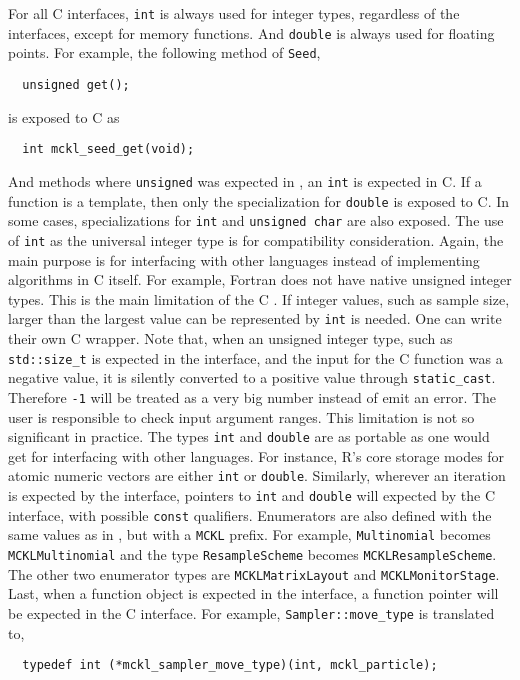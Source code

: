 For all C interfaces, \verb|int| is always used for integer types, regardless
of the \cpp interfaces, except for memory functions. And \verb|double| is
always used for floating points. For example, the following method of
\verb|Seed|,
\begin{Verbatim}
  unsigned get();
\end{Verbatim}
is exposed to C as
\begin{Verbatim}
  int mckl_seed_get(void);
\end{Verbatim}
And \rng methods where \verb|unsigned| was expected in \cpp, an \verb|int| is
expected in C. If a function is a template, then only the specialization for
\verb|double| is exposed to C. In some cases, specializations for \verb|int|
and \verb|unsigned char| are also exposed. The use of \verb|int| as the
universal integer type is for compatibility consideration. Again, the main
purpose is for interfacing with other languages instead of implementing
algorithms in C itself. For example, Fortran does not have native unsigned
integer types. This is the main limitation of the C \api. If integer values,
such as sample size, larger than the largest value can be represented by
\verb|int| is needed. One can write their own C wrapper. Note that, when an
unsigned integer type, such as \verb|std::size_t| is expected in the \cpp
interface, and the input for the C function was a negative value, it is
silently converted to a positive value through \verb|static_cast|. Therefore
\verb|-1| will be treated as a very big number instead of emit an error. The
user is responsible to check input argument ranges. This limitation is not so
significant in practice. The types \verb|int| and \verb|double| are as portable
as one would get for interfacing with other languages. For instance, R's core
storage modes for atomic numeric vectors are either \verb|int| or
\verb|double|. Similarly, wherever an iteration is expected by the \cpp
interface, pointers to \verb|int| and \verb|double| will expected by the C
interface, with possible \verb|const| qualifiers. Enumerators are also defined
with the same values as in \cpp, but with a \verb|MCKL| prefix. For example,
\verb|Multinomial| becomes \verb|MCKLMultinomial| and the type
\verb|ResampleScheme| becomes \verb|MCKLResampleScheme|. The other two
enumerator types are \verb|MCKLMatrixLayout| and \verb|MCKLMonitorStage|.
Last, when a function object is expected in the \cpp interface, a function
pointer will be expected in the C interface. For example,
\verb|Sampler::move_type| is translated to,
\begin{Verbatim}
  typedef int (*mckl_sampler_move_type)(int, mckl_particle);
\end{Verbatim}

